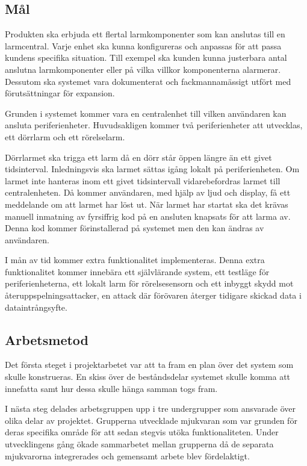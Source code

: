 \documentclass[a4paper]{article}
\begin{document}
\subsection{Mål}

Produkten ska erbjuda ett flertal larmkomponenter som kan anslutas till en larmcentral.
Varje enhet ska kunna konfigureras och anpassas för att passa kundens specifika situation.
Till exempel ska kunden kunna justerbara antal anslutna larmkomponenter eller på vilka villkor komponenterna alarmerar.
Dessutom ska systemet vara dokumenterat och fackmannamässigt utfört med förutsättningar för expansion.

Grunden i systemet kommer vara en centralenhet till vilken användaren kan ansluta periferienheter.
Huvudsakligen kommer två periferienheter att utvecklas, ett dörrlarm och ett rörelselarm.

Dörrlarmet ska trigga ett larm då en dörr står öppen längre än ett givet tidsinterval.
Inledningsvis ska larmet sättas igång lokalt på periferienheten.
Om larmet inte hanteras inom ett givet tidsintervall vidarebefordras larmet till centralenheten.
Då kommer användaren, med hjälp av ljud och display, få ett meddelande om att larmet har löst ut.
När larmet har startat ska det krävas manuell inmatning av fyrsiffrig kod på en ansluten knapsats för att larma av.
Denna kod kommer förinstallerad på systemet men den kan ändras av användaren.

I mån av tid kommer extra funktionalitet implementeras.
Denna extra funktionalitet kommer innebära ett självlärande system, ett testläge för periferienheterna, ett lokalt larm för rörelsesensorn och ett inbyggt skydd mot återuppspelningsattacker, en attack där förövaren återger tidigare skickad data i dataintrångsyfte.


\subsection{Arbetsmetod}

Det första steget i projektarbetet var att ta fram en plan över det system som skulle konstrueras.
En skiss över de beståndsdelar systemet skulle komma att innefatta samt hur dessa skulle hänga samman togs fram.

I nästa steg delades arbetsgruppen upp i tre undergrupper som ansvarade över olika delar av projektet.
Grupperna utvecklade mjukvaran som var grunden för deras specifika område för att sedan stegvis utöka funktionaliteten.
Under utvecklingens gång ökade sammarbetet mellan grupperna då de separata mjukvarorna integrerades och gemensamt arbete blev fördelaktigt.
\end{document}
